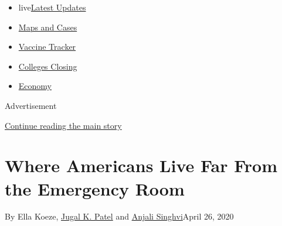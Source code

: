 \begin{itemize}
\tightlist
\item
  live\href{https://www.nytimes3xbfgragh.onion/2020/08/20/world/coronavirus-covid.html?name=styln-coronavirus-national\&region=TOP_BANNER\&variant=undefined\&block=storyline_menu_recirc\&action=click\&pgtype=Interactive\&impression_id=2805e3f1-e38d-11ea-befc-036b724b9a9b}{Latest
  Updates}
\item
  \href{https://www.nytimes3xbfgragh.onion/interactive/2020/us/coronavirus-us-cases.html?name=styln-coronavirus-national\&region=TOP_BANNER\&variant=undefined\&block=storyline_menu_recirc\&action=click\&pgtype=Interactive\&impression_id=2805e3f2-e38d-11ea-befc-036b724b9a9b}{Maps
  and Cases}
\item
  \href{https://www.nytimes3xbfgragh.onion/interactive/2020/science/coronavirus-vaccine-tracker.html?name=styln-coronavirus-national\&region=TOP_BANNER\&variant=undefined\&block=storyline_menu_recirc\&action=click\&pgtype=Interactive\&impression_id=28060b00-e38d-11ea-befc-036b724b9a9b}{Vaccine
  Tracker}
\item
  \href{https://www.nytimes3xbfgragh.onion/2020/08/19/us/colleges-closing-covid.html?name=styln-coronavirus-national\&region=TOP_BANNER\&variant=undefined\&block=storyline_menu_recirc\&action=click\&pgtype=Interactive\&impression_id=28060b01-e38d-11ea-befc-036b724b9a9b}{Colleges
  Closing}
\item
  \href{https://www.nytimes3xbfgragh.onion/live/2020/08/20/business/stock-market-today-coronavirus?name=styln-coronavirus-national\&region=TOP_BANNER\&variant=undefined\&block=storyline_menu_recirc\&action=click\&pgtype=Interactive\&impression_id=28060b02-e38d-11ea-befc-036b724b9a9b}{Economy}
\end{itemize}

Advertisement

\protect\hyperlink{after-top}{Continue reading the main story}

\hypertarget{where-americans-live-far-from-the-emergency-room}{%
\section{Where Americans Live Far From the Emergency
Room}\label{where-americans-live-far-from-the-emergency-room}}

By Ella Koeze,
\href{https://www.nytimes3xbfgragh.onion/by/jugal-k-patel}{Jugal K.
Patel} and
\href{https://www.nytimes3xbfgragh.onion/by/anjali-singhvi}{Anjali
Singhvi}April 26, 2020

